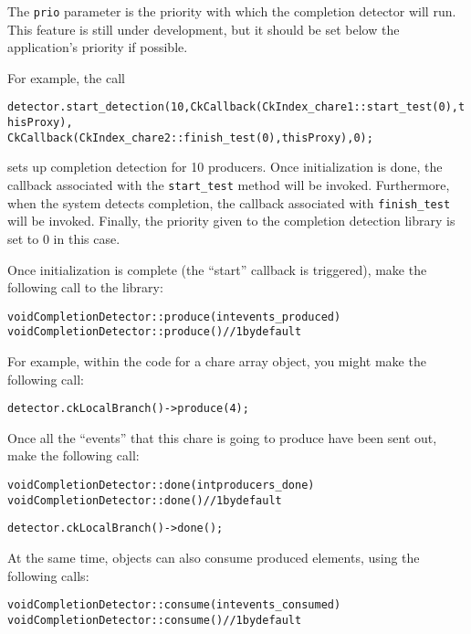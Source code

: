 The \verb|prio| parameter is the priority with which the completion detector will run. 
This feature is still under development, but it should be set below the
application's priority if possible.

For example, the call

\begin{alltt}
detector.start_detection(10, CkCallback(CkIndex_chare1::start_test(0), thisProxy),
                             CkCallback(CkIndex_chare2::finish_test(0), thisProxy), 0);
\end{alltt}

sets up completion detection for 10 producers. Once initialization is done, the callback 
associated with the {\tt start\_test} method will be invoked. Furthermore, when the system
detects completion, the callback associated with {\tt finish\_test} will be invoked. Finally,
the priority given to the completion detection library is set to 0 in this case.

Once initialization is complete (the ``start'' callback is triggered),
make the following call to the library:

\begin{alltt}
void CompletionDetector::produce(int events_produced)
void CompletionDetector::produce() // 1 by default
\end{alltt}

For example, within the code for a chare array object, you might make the following call:
\begin{alltt}
detector.ckLocalBranch()->produce(4);
\end{alltt}

Once all the ``events'' that this chare is going to produce have been sent out,
make the following call:

\begin{alltt}
void CompletionDetector::done(int producers_done)
void CompletionDetector::done() // 1 by default
\end{alltt}

\begin{alltt}
detector.ckLocalBranch()->done();
\end{alltt}

At the same time, objects can also consume produced elements, using the following calls:

\begin{alltt}
void CompletionDetector::consume(int events_consumed)
void CompletionDetector::consume() // 1 by default
\end{alltt}

